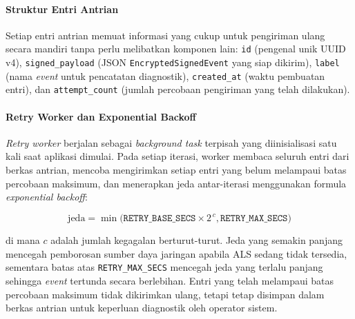 \paragraph{Struktur Entri Antrian}

Setiap entri antrian memuat informasi yang cukup untuk pengiriman ulang secara
mandiri tanpa perlu melibatkan komponen lain: \texttt{id} (pengenal unik UUID
v4), \texttt{signed\_payload} (JSON \texttt{EncryptedSignedEvent} yang siap
dikirim), \texttt{label} (nama \textit{event} untuk pencatatan diagnostik),
\texttt{created\_at} (waktu pembuatan entri), dan \texttt{attempt\_count}
(jumlah percobaan pengiriman yang telah dilakukan).

\paragraph{Retry Worker dan Exponential Backoff}

\textit{Retry worker} berjalan sebagai \textit{background task} terpisah yang
diinisialisasi satu kali saat aplikasi dimulai. Pada setiap iterasi, worker
membaca seluruh entri dari berkas antrian, mencoba mengirimkan setiap entri
yang belum melampaui batas percobaan maksimum, dan menerapkan jeda antar-iterasi
menggunakan formula \textit{exponential backoff}:

\[
	\text{jeda} = \min\big(\texttt{RETRY\_BASE\_SECS} \times 2^{\,c}, \texttt{RETRY\_MAX\_SECS}\big)
\]

\noindent di mana $c$ adalah jumlah kegagalan berturut-turut. Jeda yang semakin
panjang mencegah pemborosan sumber daya jaringan apabila ALS sedang tidak
tersedia, sementara batas atas \texttt{RETRY\_MAX\_SECS} mencegah jeda yang
terlalu panjang sehingga \textit{event} tertunda secara berlebihan. Entri yang
telah melampaui batas percobaan maksimum tidak dikirimkan ulang, tetapi tetap
disimpan dalam berkas antrian untuk keperluan diagnostik oleh operator sistem.